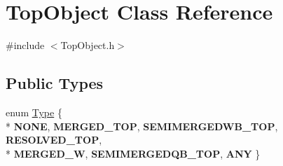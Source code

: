\hypertarget{classTopObject}{\section{Top\-Object Class Reference}
\label{classTopObject}
}


{\ttfamily \#include $<$Top\-Object.\-h$>$}

\subsection*{Public Types}
\begin{DoxyCompactItemize}
\item 
enum \hyperlink{classTopObject_af82a20e421c29bc667af7cd73fc46ba4}{Type} \{ \\*
{\bfseries N\-O\-N\-E}, 
{\bfseries M\-E\-R\-G\-E\-D\-\_\-\-T\-O\-P}, 
{\bfseries S\-E\-M\-I\-M\-E\-R\-G\-E\-D\-W\-B\-\_\-\-T\-O\-P}, 
{\bfseries R\-E\-S\-O\-L\-V\-E\-D\-\_\-\-T\-O\-P}, 
\\*
{\bfseries M\-E\-R\-G\-E\-D\-\_\-\-W}, 
{\bfseries S\-E\-M\-I\-M\-E\-R\-G\-E\-D\-Q\-B\-\_\-\-T\-O\-P}, 
{\bfseries A\-N\-Y}
 \}
\end{DoxyCompactItemize}
